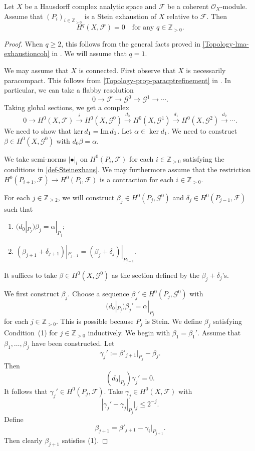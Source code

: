 \begin{thm}\label{thm-Steinexhcohvan}
    Let $X$ be a Hausdorff complex analytic space and $\mathcal{F}$ be a coherent $\mathcal{O}_X$-module. Assume that $(P_i)_{i\in \mathbb{Z}_{>0}}$ is a Stein exhaustion of $X$ relative to $\mathcal{F}$. Then
    \[
        H^q(X,\mathcal{F})=0\quad \text{for any }q\in \mathbb{Z}_{>0}.  
    \]
\end{thm}
\begin{proof}
    When $q\geq 2$, this follows from the general facts proved in \cref{Topology-lma-exhaustioncoh} in . We will assume that $q=1$.

    We may assume that $X$ is connected.
    First observe that $X$ is necessarily paracompact. This follows from \cref{Topology-prop-paracptrefinement} in . In particular, we can take a flabby resolution
    \[
        0\rightarrow \mathcal{F}\rightarrow \mathcal{G}^0\rightarrow \mathcal{G}^1\rightarrow \cdots.  
    \]
    Taking global sections, we get a complex
    \[
        0\rightarrow H^0(X,\mathcal{F})\xrightarrow{i} H^0(X,\mathcal{G}^0)\xrightarrow{d_0} H^0(X,\mathcal{G}^1)\xrightarrow{d_1}H^0(X,\mathcal{G}^2)\xrightarrow{d_2} \cdots.  
    \]
    We need to show that $\ker d_1=\operatorname{Im} d_0$. Let $\alpha\in \ker d_1$. We need to construct $\beta\in H^0(X,\mathcal{G}^0)$ with $d_0 \beta=\alpha$.

    We take semi-norms $|\bullet|_i$ on $H^0(P_i,\mathcal{F})$ for each $i\in \mathbb{Z}_{>0}$ satisfying the conditions in \cref{def-Steinexhaus}. We may furthermore assume that the restriction $H^0(P_{i+1},\mathcal{F})\rightarrow H^0(P_i,\mathcal{F})$ is a contraction for each $i\in \mathbb{Z}_{>0}$.

    For each $j\in \mathbb{Z}_{\geq 2}$, we will construct $\beta_j\in H^0(P_j,\mathcal{G}^0)$ and $\delta_j\in H^0(P_{j-1},\mathcal{F})$ such that
    \begin{enumerate}
        \item $(d_0|_{P_j})\beta_j=\alpha|_{P_j}$;
        \item $(\beta_{j+1}+\delta_{j+1})|_{P_{j-1}}=(\beta_{j}+\delta_{j})|_{P_{j-1}}$.
    \end{enumerate}
    It suffices to take $\beta\in H^0(X,\mathcal{G}^0)$ as the section defined by the $\beta_j+\delta_j$'s.

    We first construct $\beta_j$. Choose a sequence $\beta_j'\in H^0(P_j,\mathcal{G}^0)$ with 
    \[
        (d_0|_{P_j})\beta_j'=\alpha|_{P_j}  
    \]
    for each $j\in \mathbb{Z}_{>0}$. This is possible because $P_j$ is Stein. We define $\beta_j$ satisfying Condition~(1) for $j\in \mathbb{Z}_{>0}$ inductively. We begin with $\beta_1=\beta_1'$. Assume that $\beta_1,\ldots,\beta_j$ have been constructed. Let
    \[
        \gamma_j':=\beta'_{j+1}|_{P_j}-\beta_j. 
    \]
    Then
    \[
        (d_0|_{P_j})\gamma_j'=0.        
    \]
     It follows that $\gamma_j'\in H^0(P_j,\mathcal{F})$. Take $\gamma_j\in H^0(X,\mathcal{F})$ with 
    \[
        |\gamma_j'-\gamma_j|_{P_j}|_j\leq 2^{-j}.  
    \]
    Define
    \[
        \beta_{j+1}=\beta'_{j+1}-\gamma_i|_{P_{j+1}}. 
    \]
    Then clearly $\beta_{j+1}$ satisfies (1).


\end{proof}
